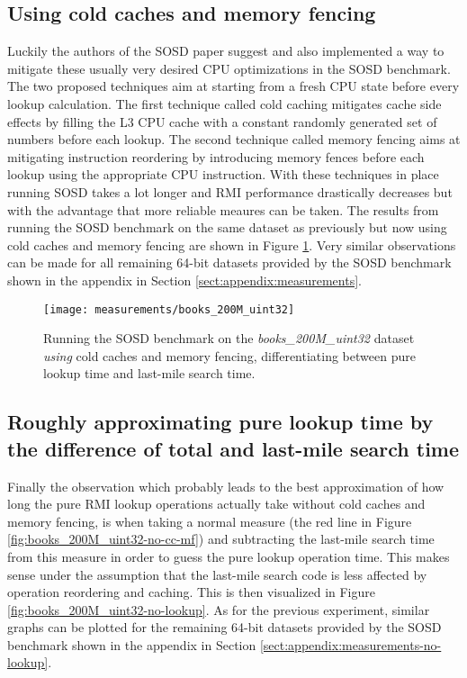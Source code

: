 \subsection{Using cold caches and memory fencing}
Luckily the authors of the SOSD paper \cite{sosd-neurips} suggest and also implemented a way to mitigate these usually very desired CPU optimizations in the SOSD benchmark. The two proposed techniques aim at starting from a fresh CPU state before every lookup calculation. The first technique called cold caching mitigates cache side effects by filling the L3 CPU cache with a constant randomly generated set of numbers before each lookup. The second technique called memory fencing aims at mitigating instruction reordering by introducing memory fences before each lookup using the appropriate CPU instruction. With these techniques in place running SOSD takes a lot longer and RMI performance drastically decreases but with the advantage that more reliable meaures can be taken. The results from running the SOSD benchmark on the same dataset as previously but now using cold caches and memory fencing are shown in Figure \ref{fig:books_200M_uint32}. Very similar observations can be made for all remaining 64-bit datasets provided by the SOSD benchmark shown in the appendix in Section \ref{sect:appendix:measurements}.

\captionsetup[figure]{skip=10pt} %
\begin{figure}[!ht]
  \centering
  \texttt{[image: measurements/books\_200M\_uint32]}
  \caption[Lookup and last-mile search time measures \emph{using} cold caches and memory fencing]{
    Running the SOSD benchmark on the \emph{books\_200M\_uint32} dataset \emph{using} cold caches and memory fencing, differentiating between pure lookup time and last-mile search time.
  }
  \label{fig:books_200M_uint32}
\end{figure}

\subsection{Roughly approximating pure lookup time by the difference of total and last-mile search time}
Finally the observation which probably leads to the best approximation of how long the pure RMI lookup operations actually take without cold caches and memory fencing, is when taking a normal measure (the red line in Figure \ref{fig:books_200M_uint32-no-cc-mf}) and subtracting the last-mile search time from this measure in order to guess the pure lookup operation time. This makes sense under the assumption that the last-mile search code is less affected by operation reordering and caching. This is then visualized in Figure \ref{fig:books_200M_uint32-no-lookup}. As for the previous experiment, similar graphs can be plotted for the remaining 64-bit datasets provided by the SOSD benchmark shown in the appendix in Section \ref{sect:appendix:measurements-no-lookup}.

